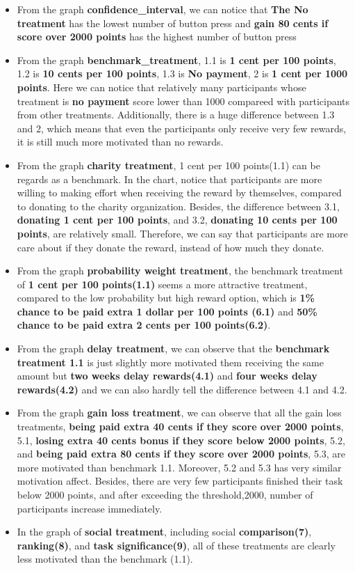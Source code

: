 \documentclass[11pt
]{article}
\begin{document}
\begin{itemize}
\item
  From the graph \textbf{confidence\_interval}, we can notice that
  \textbf{The No treatment} has the lowest number of button press and \textbf{gain
  80 cents if score over 2000 points} has the highest number of button press
\item
  From the graph \textbf{benchmark\_treatment}, 1.1 is \textbf{1 cent
  per 100 points}, 1.2 is \textbf{10 cents per 100 points}, 1.3 is
  \textbf{No payment}, 2 is \textbf{1 cent per 1000 points}. Here we can
  notice that relatively many participants whose treatment is
  \textbf{no payment} score lower than 1000 compareed with participants
  from other treatments. Additionally, there is a huge difference between
  1.3 and 2, which means that even the participants only receive very
  few rewards, it is still much more motivated than no rewards.
\item
  From the graph \textbf{charity treatment}, 1 cent per 100 points(1.1)
  can be regards as a benchmark. In the chart, notice that participants
  are more willing to making effort when receiving the reward by themselves, compared
  to donating to the charity organization. Besides, the difference between
  3.1, \textbf{donating 1 cent per 100 points}, and 3.2,
  \textbf{donating 10 cents per 100 points}, are relatively small.
  Therefore, we can say that participants are more care about if they
  donate the reward, instead of how much they donate.
\item
  From the graph \textbf{probability weight treatment}, the benchmark
  treatment of \textbf{1 cent per 100 points(1.1)} seems a more attractive
  treatment, compared to the low probability but high reward option, which
  is \textbf{1\% chance to be paid extra 1 dollar per 100 points (6.1)}
  and \textbf{50\% chance to be paid extra 2 cents per 100 points(6.2)}.
\item
  From the graph \textbf{delay treatment}, we can observe that the
  \textbf{benchmark treatment 1.1} is just slightly more motivated them
  receiving the same amount but \textbf{two weeks delay rewards(4.1)} and \textbf{four weeks
  delay rewards(4.2)} and we can also hardly tell the difference between
  4.1 and 4.2.
\item
  From the graph \textbf{gain loss treatment}, we can observe that all
  the gain loss treatments, \textbf{being paid extra 40 cents if they
  score over 2000 points}, 5.1, \textbf{losing extra 40 cents bonus if
  they score below 2000 points}, 5.2, and \textbf{being paid extra 80
  cents if they score over 2000 points}, 5.3, are more motivated than
  benchmark 1.1. Moreover, 5.2 and 5.3 has very similar motivation
  affect. Besides, there are very few participants finished their task
  below 2000 points, and after exceeding the threshold,2000, number of
  participants increase immediately.
\item
  In the graph of \textbf{social treatment}, including social
  \textbf{comparison(7)}, \textbf{ranking(8)}, and \textbf{task significance(9)}, all of these
  treatments are clearly less motivated than the benchmark (1.1).
\end{itemize}
\end{document}
